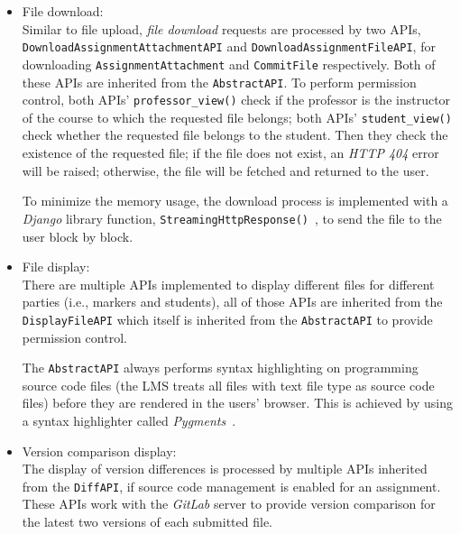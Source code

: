 \begin{itemize}
    \item File download: \\
    Similar to file upload, \emph{file download} requests are processed by
    two APIs, \texttt{Down\-load\-Assign\-ment\-Attach\-ment\-API} and
    \texttt{Down\-load\-Assign\-ment\-File\-API},
    for downloading \texttt{AssignmentAttachment} and \texttt{CommitFile}
    respectively.
    Both
    of these APIs are inherited from the \texttt{AbstractAPI}\null.
    To perform permission control,
    both APIs' \texttt{professor\_view()} check if the professor is the
    instructor of the course to which the requested file belongs; both APIs'
    \texttt{student\_view()} check whether the requested file belongs to the student.
    Then they check the existence of the requested file; if the file
    does not exist, an \emph{HTTP 404} error~\citep[Section 6.5.4]{http} will be
    raised; otherwise, the
    file will be fetched and returned to the user.

    To minimize the memory usage, the download process is implemented with
    a \emph{Django} library function,
    \texttt{StreamingHttpResponse()}~\citep[Section Streaming\-Http\-Response
    objects]{DdjangoRequest},
    to send the file to the user block by block.

    \item File display: \\
    There are multiple APIs implemented to display different files for different
    parties
    (i.e., markers and students), all of those APIs are inherited from the
    \texttt{DisplayFileAPI} which itself is inherited from the
    \texttt{AbstractAPI} to provide permission control.

    The \texttt{AbstractAPI} always performs
    syntax highlighting on programming source code files
    (the LMS treats all files with text file type as source code files)
    before they are rendered in the users' browser.
    This is achieved by
    using a syntax highlighter called \emph{Pygments}~\cite{Bpygments}.

    \item Version comparison display: \\
    The display of version differences is processed by multiple APIs inherited
    from the \texttt{Diff\-API}, if source code management is enabled for an
    assignment. These APIs work with the \emph{GitLab} server to provide version
    comparison for the latest two versions of each submitted file.
\end{itemize}

